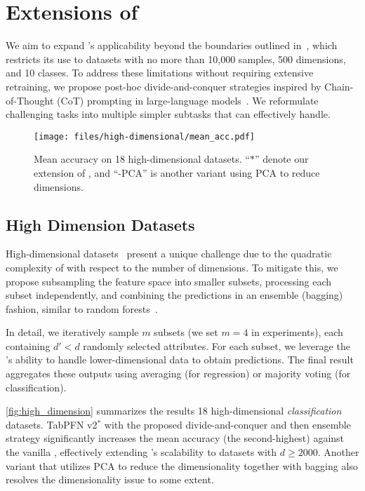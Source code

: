 \section{Extensions of \ours}\label{sec:extension}
We aim to expand \ours's applicability beyond the boundaries outlined in~\citet{hollmann2025TabPFNv2}, which restricts its use to datasets with no more than 10,000 samples, 500 dimensions, and 10 classes. To address these limitations without requiring extensive retraining, we propose post-hoc divide-and-conquer strategies inspired by Chain-of-Thought (CoT) prompting in large-language models~\cite{Wei2022CoT}. We reformulate challenging tasks into multiple simpler subtasks that \ours can effectively handle.

\begin{figure}[t]
    \centering
    \texttt{[image: files/high-dimensional/mean\_acc.pdf]}
        \vspace{-8mm}
    \caption{Mean accuracy on 18 high-dimensional datasets. ``$*$'' denote our extension of \ours, and ``-PCA'' is another variant using PCA to reduce dimensions.}
    \vspace{-5mm}
    \label{fig:high_dimension}
\end{figure}

\subsection{High Dimension Datasets}
High-dimensional datasets~\cite{Jiang2024ProtoGate} present a unique challenge due to the quadratic complexity of \ours with respect to the number of dimensions. To mitigate this, we propose subsampling the feature space into smaller subsets, processing each subset independently, and combining the predictions in an ensemble (bagging) fashion, similar to random forests~\cite{Breiman01RandomForest}.

In detail, we iteratively sample $m$ subsets (we set $m=4$ in experiments), each containing $d' < d$ randomly selected attributes. For each subset, we leverage the \ours's ability to handle lower-dimensional data to obtain predictions. The final result aggregates these outputs using averaging (for regression) or majority voting (for classification).


\autoref{fig:high_dimension} summarizes the results 18 high-dimensional \emph{classification} datasets.  TabPFN v2$^*$ with the proposed divide-and-conquer and then ensemble strategy significantly increases the mean accuracy (the second-highest)
against the vanilla \ours, effectively  extending \ours's scalability to datasets with $d \ge 2000$. 
Another variant that utilizes PCA to reduce the dimensionality together with bagging also resolves the dimensionality issue to some extent.


